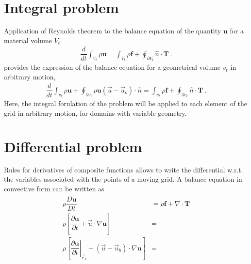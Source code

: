 \documentclass[letterpaper,10pt,english]{jupyterBook}
\begin{document}
\section{Integral problem}
\label{\detokenize{ch/pde/ale:integral-problem}}\label{\detokenize{ch/pde/ale:pde-ale-description-integral}}
\sphinxAtStartPar
Application of Reynolds theorem to the balance equation of the quantity \(\mathbf{u}\) for a material volume \(V_t\)
\begin{equation*}
\begin{split}\dfrac{d}{dt} \int_{V_t} \rho \mathbf{u} = \int_{V_t} \rho \mathbf{f} + \oint_{\partial V_t} \hat{n} \cdot \mathbf{T} \ .\end{split}
\end{equation*}
\sphinxAtStartPar
provides the expression of the balance equation for a geometrical volume \(v_t\) in arbitrary motion,
\begin{equation*}
\begin{split}\dfrac{d}{dt} \int_{v_t} \rho \mathbf{u} + \oint_{\partial v_t} \rho \mathbf{u} \left( \vec{u} - \vec{u}_b \right) \cdot \hat{n} = \int_{v_t} \rho \mathbf{f} + \oint_{\partial v_t} \hat{n} \cdot \mathbf{T} \ .\end{split}
\end{equation*}
\sphinxAtStartPar
Here, the integral forulation of the problem will be applied to each element of the grid in arbitrary motion, for domains with variable geometry.


\section{Differential problem}
\label{\detokenize{ch/pde/ale:differential-problem}}\label{\detokenize{ch/pde/ale:pde-ale-description-differential}}
\sphinxAtStartPar
Rules for derivatives of composite functions allows to write the differential w.r.t. the variables associated with the points of a moving grid. A balance equation in convective form can be written as
\begin{equation*}
\begin{split}\begin{aligned}
  \rho \dfrac{D \mathbf{u}}{D t} & = \rho \mathbf{f} + \nabla \cdot \mathbf{T} \\
  \rho \left[ \dfrac{\partial \mathbf{u}}{\partial t} + \vec{u} \cdot \nabla \mathbf{u} \right] & = \\
  \rho \left[ \left.\dfrac{\partial \mathbf{u}}{\partial t}\right|_{\vec{r}_b} + \left( \vec{u} - \vec{u}_b \right) \cdot \nabla \mathbf{u} \right] & = \\
\end{aligned}\end{split}
\end{equation*}
\sphinxstepscope
\end{document}
